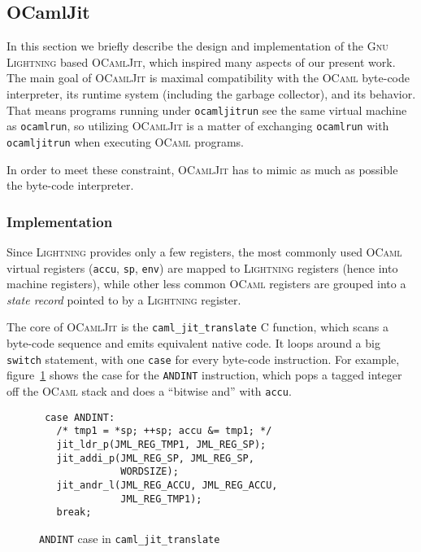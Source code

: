 \documentclass[10pt,a4paper,twocolumn]{article}
\begin{document}
\subsection{OCamlJit} \label{subsection:OCamlJit}

In this section we briefly describe the design and implementation of the \textsc{Gnu Lightning}\cite{Bonzini10}
based \textsc{OCamlJit}\cite{Starynkevitch04},
which inspired many aspects of our present work. The main goal of \textsc{OCamlJit} is maximal compatibility
with the \textsc{OCaml} byte-code interpreter, its runtime system (including the garbage collector), and its
behavior. That means programs running under \texttt{ocamljitrun} see the same virtual machine as
\texttt{ocamlrun}, so utilizing \textsc{OCamlJit} is a matter of exchanging \texttt{ocamlrun} with
\texttt{ocamljitrun} when executing \textsc{OCaml} programs.

In order to meet these constraint, \textsc{OCamlJit} has to mimic as much as possible the byte-code
interpreter.

\subsubsection{Implementation}

Since \textsc{Lightning} provides only a few registers, the most commonly used \textsc{OCaml} virtual
registers (\texttt{accu}, \texttt{sp}, \texttt{env}) are mapped to \textsc{Lightning} registers (hence
into machine registers), while other less common \textsc{OCaml} registers are grouped into a \emph{state
record} pointed to by a \textsc{Lightning} register.

The core of \textsc{OCamlJit} is the \texttt{caml\_jit\_translate} C function, which scans a byte-code
sequence and emits equivalent native code. It loops around a big \texttt{switch} statement, with one
\texttt{case} for every byte-code instruction. For example, figure~\ref{figure:caml_jit_translate_andint} shows
the case for the \texttt{ANDINT} instruction, which pops a tagged integer off the \textsc{OCaml} stack
and does a ``bitwise and'' with \texttt{accu}.

\begin{figure}[ht]
  \centering
  \begin{verbatim}
 case ANDINT:
   /* tmp1 = *sp; ++sp; accu &= tmp1; */
   jit_ldr_p(JML_REG_TMP1, JML_REG_SP);
   jit_addi_p(JML_REG_SP, JML_REG_SP,
              WORDSIZE);
   jit_andr_l(JML_REG_ACCU, JML_REG_ACCU,
              JML_REG_TMP1);
   break;
\end{verbatim}
  \caption{\texttt{ANDINT} case in \texttt{caml\_jit\_translate}}
  \label{figure:caml_jit_translate_andint}
\end{figure}
\end{document}

